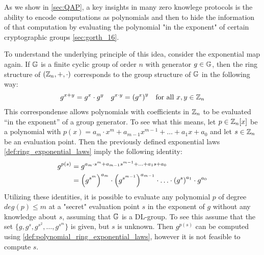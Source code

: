 \begin{example} As we show in \ref{sec:QAP}, a key insights in many zero knowlege protocols is the ability to encode computations as polynomials and then to hide the information of that computation by evaluating the polynomial "in the exponent" of certain cryptographic groups \ref{sec:gorth_16}.

To understand the underlying principle of this idea, consider the exponential map \pageref{exponentialmap} again. If $\mathbb{G}$ is a finite cyclic group of order $n$ with generator $g\in\mathbb{G}$, then the ring structure of $(\mathbb{Z}_n,+,\cdot)$ corresponds to the group structure of $\mathbb{G}$ in the following way:
\begin{align}
\label{def:ring_exponential_laws}
g^{x+y} &= g^x\cdot g^y & 
g^{x\cdot y} &= \left( g^x\right)^y & \text{for all } x,y\in\mathbb{Z}_n
\end{align}
This correspondense allows polynomials with coefficients in $\mathbb{Z}_n$ to be evaluated ``in the exponent'' of a group generator. To see what this means, let $p\in \mathbb{Z}_n[x]$ be a polynomial with $p(x)=a_m\cdot x^m+a_{m-1}x^{m-1}+\ldots + a_1x +a_0$ and let $s\in\mathbb{Z}_n$ be an evaluation point. Then the previously defined exponential laws \ref{def:ring_exponential_laws} imply the following identity:
\begin{align}
\label{def:polynomial_ring_exponential_laws}
g^{p(s)} & = g^{a_m\cdot s^m+a_{m-1}s^{m-1}+\ldots + a_1s +a_0}\\
         & = \left(g^{s^m}\right)^{a_m}\cdot \left(g^{s^{m-1}}\right)^{a_{m-1}}\cdot \ldots\cdot \left(g^{s}\right)^{a_1}\cdot g^{a_0}\notag
\end{align}
Utilizing these identities, it is possible to evaluate any polynomial $p$ of degree $deg(p)\leq m$ at a "secret" evaluation point $s$ in the exponent of $g$ without any knowledge about $s$, assuming that $\mathbb{G}$ is a DL-group. To see this assume that the set $\{g,g^s, g^{s^2},\ldots, g^{s^m}\}$ is given, but $s$ is unknown. Then 
$g^{p(s)}$ can be computed using \ref{def:polynomial_ring_exponential_laws}, however it is not feasible to compute $s$.   
\end{example}

